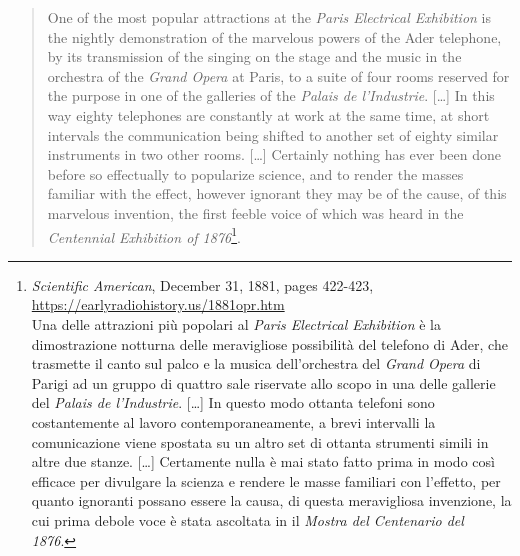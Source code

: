\begin{quotation}
One of the most popular attractions at the \emph{Paris Electrical Exhibition} is
the nightly demonstration of the marvelous powers of the Ader telephone, by its
transmission of the singing on the stage and the music in the orchestra of the
\emph{Grand Opera} at Paris, to a suite of four rooms reserved for the purpose
in one of the galleries of the \emph{Palais de l'Industrie}. [\ldots] In this
way eighty telephones are constantly at work at the same time, at short
intervals the communication being shifted to another set of eighty similar
instruments in two other rooms. [\ldots] Certainly nothing has ever been done
before so effectually to popularize science, and to render the masses familiar
with the effect, however ignorant they may be of the cause, of this marvelous
invention, the first feeble voice of which was heard in the \emph{Centennial
Exhibition of 1876}\footnote{
\emph{Scientific American}, December 31, 1881, pages 422-423,\\
\url{https://earlyradiohistory.us/1881opr.htm}\\
Una delle attrazioni più popolari al \emph{Paris Electrical Exhibition} è la
dimostrazione notturna delle meravigliose possibilità del telefono di Ader,
che trasmette il canto sul palco e la musica dell'orchestra del \emph{Grand Opera}
di Parigi ad un gruppo di quattro sale riservate allo scopo in una delle gallerie
del \emph{Palais de l'Industrie}. [\ldots] In questo modo ottanta telefoni sono
costantemente al lavoro contemporaneamente, a brevi intervalli la comunicazione
viene spostata su un altro set di ottanta strumenti simili in altre due stanze.
[\ldots] Certamente nulla è mai stato fatto prima in modo così efficace per
divulgare la scienza e rendere le masse familiari con l'effetto, per quanto
ignoranti possano essere la causa, di questa meravigliosa invenzione, la cui
prima debole voce è stata ascoltata in il \emph{Mostra del Centenario del 1876}.}.
\end{quotation}

